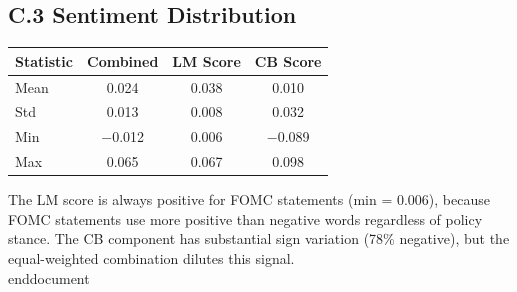 \documentclass[12pt]{article}
\begin{document}
\subsection{C.3 Sentiment Distribution}

\begin{table}[htbp]
\centering
\begin{tabular}{lccc}
\toprule
Statistic & Combined & LM Score & CB Score \\
\midrule
Mean & 0.024 & 0.038 & 0.010 \\
Std & 0.013 & 0.008 & 0.032 \\
Min & $-$0.012 & 0.006 & $-$0.089 \\
Max & 0.065 & 0.067 & 0.098 \\
\bottomrule
\end{tabular}
\end{table}

The LM score is always positive for FOMC statements (min = 0.006), because FOMC statements use more positive than negative words regardless of policy stance. The CB component has substantial sign variation (78\% negative), but the equal-weighted combination dilutes this signal.\\end{document}
\end{document}
